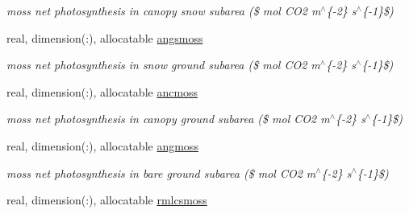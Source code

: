 \begin{DoxyCompactItemize}
\begin{DoxyCompactList}\small\item\em moss net photosynthesis in canopy snow subarea (\$ mol C\+O2 m$^\wedge$\{-\/2\} s$^\wedge$\{-\/1\}\$) \end{DoxyCompactList}\item 
\hypertarget{structctem__statevars_1_1veg__gat_a3aec3739923ac04dd8677450d8d08708}{}real, dimension(\+:), allocatable \hyperlink{structctem__statevars_1_1veg__gat_a3aec3739923ac04dd8677450d8d08708}{angsmoss}\label{structctem__statevars_1_1veg__gat_a3aec3739923ac04dd8677450d8d08708}

\begin{DoxyCompactList}\small\item\em moss net photosynthesis in snow ground subarea (\$ mol C\+O2 m$^\wedge$\{-\/2\} s$^\wedge$\{-\/1\}\$) \end{DoxyCompactList}\item 
\hypertarget{structctem__statevars_1_1veg__gat_a6e0e481b9a68829da7ef78b1b6846092}{}real, dimension(\+:), allocatable \hyperlink{structctem__statevars_1_1veg__gat_a6e0e481b9a68829da7ef78b1b6846092}{ancmoss}\label{structctem__statevars_1_1veg__gat_a6e0e481b9a68829da7ef78b1b6846092}

\begin{DoxyCompactList}\small\item\em moss net photosynthesis in canopy ground subarea (\$ mol C\+O2 m$^\wedge$\{-\/2\} s$^\wedge$\{-\/1\}\$) \end{DoxyCompactList}\item 
\hypertarget{structctem__statevars_1_1veg__gat_a813f911e77cb265487141919016cbfa9}{}real, dimension(\+:), allocatable \hyperlink{structctem__statevars_1_1veg__gat_a813f911e77cb265487141919016cbfa9}{angmoss}\label{structctem__statevars_1_1veg__gat_a813f911e77cb265487141919016cbfa9}

\begin{DoxyCompactList}\small\item\em moss net photosynthesis in bare ground subarea (\$ mol C\+O2 m$^\wedge$\{-\/2\} s$^\wedge$\{-\/1\}\$) \end{DoxyCompactList}\item 
\hypertarget{structctem__statevars_1_1veg__gat_a0f9639e702fc134aaebefc205e465703}{}real, dimension(\+:), allocatable \hyperlink{structctem__statevars_1_1veg__gat_a0f9639e702fc134aaebefc205e465703}{rmlcsmoss}\label{structctem__statevars_1_1veg__gat_a0f9639e702fc134aaebefc205e465703}


\end{DoxyCompactItemize}
